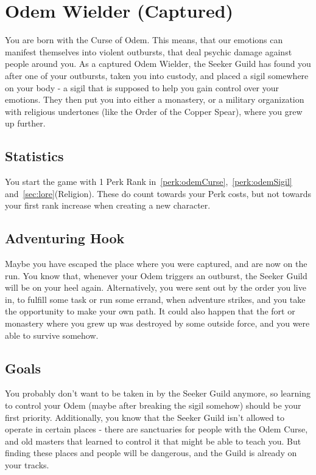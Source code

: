 \section{Odem Wielder (Captured)}\label{background:odemWielderCaptured}
You are born with the Curse of Odem.
This means, that our emotions can manifest themselves into violent outbursts, that deal psychic damage against people around you.
As a captured Odem Wielder, the Seeker Guild has found you after one of your outbursts, taken you into custody, and placed a sigil somewhere on your body - a sigil that is supposed to help you gain control over your emotions.
They then put you into either a monastery, or a military organization with religious undertones (like the Order of the Copper Spear), where you grew up further.

\subsection{Statistics}
You start the game with 1 Perk Rank in~\ref{perk:odemCurse},~\ref{perk:odemSigil} and~\ref{sec:lore}(Religion).
These do count towards your Perk costs, but not towards your first rank increase when creating a new character.

\subsection{Adventuring Hook}
Maybe you have escaped the place where you were captured, and are now on the run.
You know that, whenever your Odem triggers an outburst, the Seeker Guild will be on your heel again.
Alternatively, you were sent out by the order you live in, to fulfill some task or run some errand, when adventure strikes, and you take the opportunity to make your own path.
It could also happen that the fort or monastery where you grew up was destroyed by some outside force, and you were able to survive somehow.

\subsection{Goals}
You probably don't want to be taken in by the Seeker Guild anymore, so learning to control your Odem (maybe after breaking the sigil somehow) should be your first priority.
Additionally, you know that the Seeker Guild isn't allowed to operate in certain places - there are sanctuaries for people with the Odem Curse, and old masters that learned to control it that might be able to teach you.
But finding these places and people will be dangerous, and the Guild is already on your tracks.